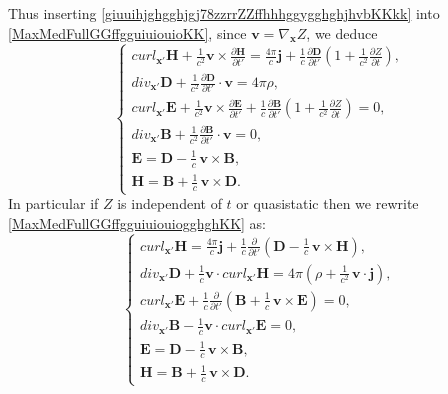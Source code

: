 \documentclass{article}
\theoremstyle{definition}
\theoremstyle{remark}
\renewcommand{\vec}[1]{\mathbf{#1}}
\newcommand{\R}{\mathbb{R}}
\newcommand{\er}{\eqref}
\newcommand{\R}{{\mathbb{R}}}
\newcommand{\er}{\eqref}
\begin{document}
Thus inserting \er{giuuihjghgghjgj78zzrrZZffhhhggygghghjhvbKKkk}
into \er{MaxMedFullGGffgguiuiouioKK}, since $\vec v=\nabla_{\vec
x}Z$, we deduce
\begin{equation}\label{MaxMedFullGGffgguiuiouiogghghKK}
\begin{cases}
curl_{\vec x'}\vec H+\frac{1}{c^2}\vec v\times\frac{\partial \vec
H}{\partial t'}= \frac{4\pi}{c}\vec j+ \frac{1}{c}\frac{\partial
\vec D}{\partial
t'}\left(1+\frac{1}{c^2}\frac{\partial Z}{\partial t}\right),\\
div_{\vec x'}\vec D+\frac{1}{c^2}\frac{\partial \vec
D}{\partial t'}\cdot\vec v= 4\pi\rho,\\
curl_{\vec x'}\vec E+\frac{1}{c^2}\vec v\times\frac{\partial \vec
E}{\partial t'}+\frac{1}{c}\frac{\partial \vec B}{\partial
t'}\left(1+\frac{1}{c^2}\frac{\partial Z}{\partial t}\right)=0,\\
div_{\vec x'}\vec B+\frac{1}{c^2}\frac{\partial \vec
B}{\partial t'}\cdot\vec v=0,\\
\vec E=\vec D-\frac{1}{c}\,\vec v\times \vec B,\\
\vec H=\vec B+\frac{1}{c}\,\vec v\times \vec D.
\end{cases}
\end{equation}
In particular if $Z$ is independent of $t$ or quasistatic then we
rewrite \er{MaxMedFullGGffgguiuiouiogghghKK} as:
\begin{equation}\label{MaxMedFullGGffgguiuiouiogghghhgghhjhjKK}
\begin{cases}
curl_{\vec x'}\vec H= \frac{4\pi}{c}\vec j+
\frac{1}{c}\frac{\partial }{\partial
t'}\left(\vec D-\frac{1}{c}\,\vec v\times \vec H\right),\\
div_{\vec x'}\vec D+\frac{1}{c}\vec v\cdot curl_{\vec x'}\vec H= 4\pi\left(\rho+\frac{1}{c^2}\,\vec v\cdot\vec j\right),\\
curl_{\vec x'}\vec E+\frac{1}{c}\frac{\partial}{\partial
t'}\left(\vec B+\frac{1}{c}\,\vec v\times \vec E\right)=0,\\
div_{\vec x'}\vec B-\frac{1}{c}\vec v\cdot curl_{\vec x'}\vec E=0,\\
\vec E=\vec D-\frac{1}{c}\,\vec v\times \vec B,\\
\vec H=\vec B+\frac{1}{c}\,\vec v\times \vec D.
\end{cases}
\end{equation}
\end{document}
